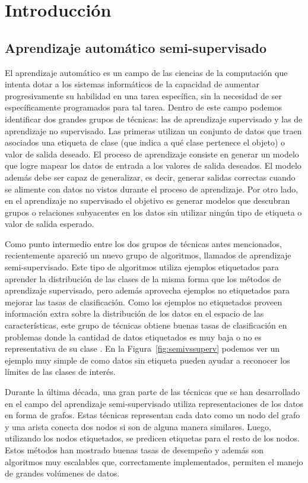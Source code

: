 \chapter{Introducción}
\section{Aprendizaje automático semi-supervisado}

El aprendizaje automático es un campo de las ciencias de la computación que intenta dotar a los sistemas informáticos de la capacidad de aumentar
progresivamente su habilidad en una tarea específica, sin la necesidad de ser específicamente programados para tal tarea. Dentro de este campo podemos
identificar dos grandes grupos de técnicas: las de aprendizaje supervisado y las de aprendizaje no supervisado. Las primeras utilizan un conjunto de datos que
traen asociados una etiqueta de clase (que indica a qué clase pertenece el objeto) o valor de salida deseado. El proceso de aprendizaje consiste en generar un
modelo que logre mapear los datos de entrada a los valores de salida deseados. El modelo además debe ser capaz de generalizar, es decir, generar salidas correctas
cuando se alimente con datos no vistos durante el proceso de aprendizaje. Por otro lado, en el aprendizaje no supervisado el objetivo es generar modelos que
descubran grupos o relaciones subyacentes en los datos sin utilizar ningún tipo de etiqueta o valor de salida esperado.

Como punto intermedio entre los dos grupos de técnicas antes mencionados, recientemente apareció un nuevo grupo de algoritmos, llamados de aprendizaje
semi-supervisado. Este tipo de algoritmos utiliza ejemplos etiquetados para aprender la distribución de las clases de la misma forma que los métodos de
aprendizaje supervisado, pero además aprovecha ejemplos no etiquetados para mejorar las tasas de clasificación. Como los ejemplos no etiquetados proveen
información extra sobre la distribución de los datos en el espacio de las características, este grupo de técnicas obtiene buenas tasas de clasificación en
problemas donde la cantidad de datos etiquetados es muy baja o no es representativa de su clase \citep{chapelle2006semi}. En la Figura~\ref{fig:semivssuperv}
podemos ver un ejemplo muy simple de como datos sin etiqueta pueden ayudar a reconocer los límites de las clases de interés.

Durante la última década, una gran parte de las técnicas que se han desarrollado en el campo del aprendizaje semi-supervisado utiliza representaciones de
los datos en forma de grafos. Estas técnicas representan cada dato como un nodo del grafo y una arista conecta dos nodos si son de alguna manera similares.
Luego, utilizando los nodos etiquetados, se predicen etiquetas para el resto de los nodos. Estos métodos han mostrado buenas tasas de desempeño
\citep{joachims2003transductive} y además son algoritmos muy escalables que, correctamente implementados, permiten el manejo de grandes volúmenes de datos.

